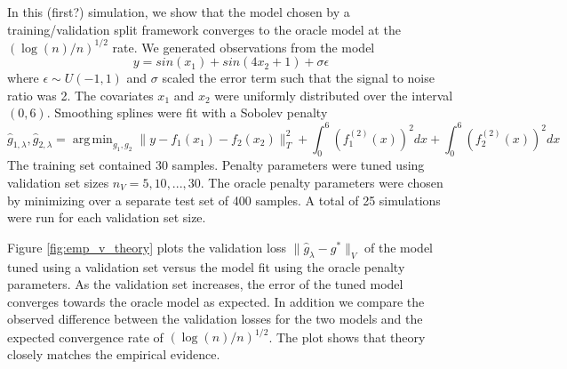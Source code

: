\documentclass[12pt]{article}
\DeclareMathOperator*{\argmin}{arg\,min}
\begin{document}
In this (first?) simulation, we show that the model chosen by a training/validation split framework converges to the oracle model at the $(\log(n)/n)^{1/2}$ rate. We generated observations from the model
\begin{equation}
y = sin(x_1) + sin(4 x_2 + 1) + \sigma \epsilon
\end{equation}
where $\epsilon \sim U(-1,1)$ and $\sigma$ scaled the error term such that the signal to noise ratio was 2.
The covariates $x_1$ and $x_2$ were uniformly distributed over the interval $(0,6)$.
Smoothing splines were fit with a Sobolev penalty
\begin{equation}
\hat{g}_{1, \lambda}, \hat{g}_{2, \lambda} = \argmin_{g_1, g_2} \| y - f_1(x_1) - f_2(x_2) \|_T^2 + \int_0^6 (f_1^{(2)}(x))^2 dx + \int_0^6 (f_2^{(2)}(x))^2 dx
\end{equation}
The training set contained 30 samples. Penalty parameters were tuned using validation set sizes $n_V = 5, 10, ..., 30$. The oracle penalty parameters were chosen by minimizing over a separate test set of 400 samples. A total of 25 simulations were run for each validation set size.

Figure \ref{fig:emp_v_theory} plots the validation loss $\| \hat{g}_{\lambda} - g^* \|_V$ of the model tuned using a validation set versus the model fit using the oracle penalty parameters. As the validation set increases, the error of the tuned model converges towards the oracle model as expected. In addition we compare the observed difference between the validation losses for the two models and the expected convergence rate of $(\log(n)/n)^{1/2}$. The plot shows that theory closely matches the empirical evidence.
\end{document}
